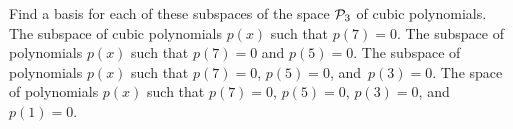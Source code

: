 
\begin{Exercise}[
name={},
title={}, 
difficulty=0,
origin={\cite{JH}}]
Find a basis for each of these subspaces of the space 
$\mathcal{P}_3$ of cubic polynomials. 
\Question The subspace of cubic polynomials $p(x)$ 
such that $p(7)=0$.
\Question The subspace of polynomials $p(x)$ such
that $p(7)=0$ and $p(5)=0$.
\Question The subspace of polynomials $p(x)$ such
that $p(7)=0$, $p(5)=0$, and~$p(3)=0$.
\Question The space of polynomials $p(x)$ such
that $p(7)=0$, $p(5)=0$, $p(3)=0$, and~$p(1)=0$.
\end{Exercise}

